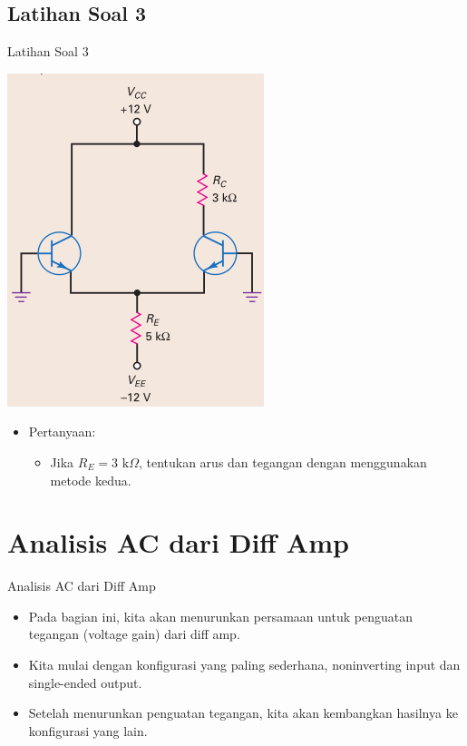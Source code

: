 \documentclass[aspectratio=169]{beamer}
\begin{document}
\subsection{Latihan Soal 3}
\begin{frame}{Latihan Soal 3}
	\begin{multicols}{2}
		\begin{center}
			\includegraphics[width=0.6\textheight]{gambar/01.diff-amp/01.latihan_soal_3}
		\end{center}
		\columnbreak
		\begin{itemize}
			\item Pertanyaan:
			\begin{itemize}
				\item Jika $ R_E = 3 \text{ k}\Omega $, tentukan arus dan tegangan dengan menggunakan metode kedua.
			\end{itemize}
		\end{itemize}
		\vfill\null
	\end{multicols}
\end{frame}

\section{Analisis AC dari Diff Amp}
\begin{frame}{Analisis AC dari Diff Amp}
	\begin{itemize}
		\item Pada bagian ini, kita akan menurunkan persamaan untuk penguatan tegangan (voltage gain) dari diff amp.
		\item Kita mulai dengan konfigurasi yang paling sederhana, noninverting input dan single-ended output.
		\item Setelah menurunkan penguatan tegangan, kita akan kembangkan hasilnya ke konfigurasi yang lain.
	\end{itemize}
\end{frame}
\end{document}
